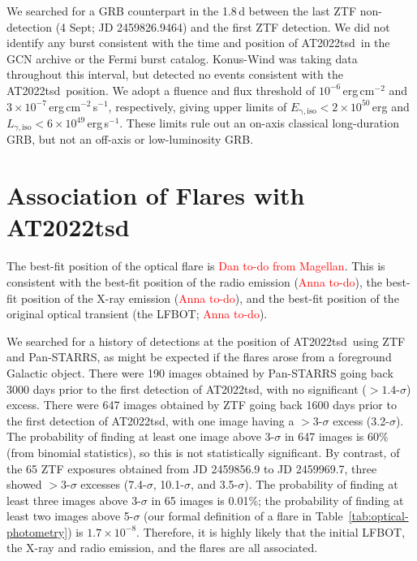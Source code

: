 \documentclass{nature_plusfigure}
\newcommand{\at}{AT2022tsd}
\begin{document}
\begin{methods}
We searched for a GRB counterpart in the 1.8\,d between the last ZTF non-detection (4 Sept; JD 2459826.9464) and the first ZTF detection. We did not identify any burst consistent with the time and position of \at\ in the GCN archive or the Fermi burst catalog. Konus-Wind was taking data throughout this interval, but detected no events consistent with the \at\ position. We adopt a  fluence and flux threshold of $10^{-6}\,$erg\,cm$^{-2}$ and $3\times10^{-7}\,$erg\,cm$^{-2}$\,s$^{-1}$, respectively\cite{Tsvetkova2017},
giving upper limits of $E_\mathrm{\gamma,iso}<2\times10^{50}\,$erg and $L_{\gamma,\mathrm{iso}}<6\times10^{49}\,$erg\,s$^{-1}$.
These limits rule out an on-axis classical long-duration GRB, but not an off-axis or low-luminosity GRB\cite{Cano2017}.

\section{Association of Flares with \at}
\label{sec:flare-association}

The best-fit position of the optical flare is \textcolor{red}{Dan to-do from Magellan}. This is consistent with the best-fit position of the radio emission (\textcolor{red}{Anna to-do}), the best-fit position of the X-ray emission (\textcolor{red}{Anna to-do}), and the best-fit position of the original optical transient (the LFBOT; \textcolor{red}{Anna to-do}). 

We searched for a history of detections at the position of \at\ using ZTF and Pan-STARRS, as might be expected if the flares arose from a foreground Galactic object. There were 190 images obtained by Pan-STARRS going back 3000 days prior to the first detection of \at, with no significant ($>1.4$-$\sigma$) excess\cite{Fulton2022}. There were 647 images obtained by ZTF going back 1600 days prior to the first detection of \at, with one image having a $>3$-$\sigma$ excess (3.2-$\sigma$). The probability of finding at least one image above 3-$\sigma$ in 647 images is 60\% (from binomial statistics), so this is not statistically significant. By contrast, of the 65 ZTF exposures obtained from JD 2459856.9 to JD 2459969.7, three showed $>3$-$\sigma$ excesses (7.4-$\sigma$, 10.1-$\sigma$, and 3.5-$\sigma$). The probability of finding at least three images above 3-$\sigma$ in 65 images is 0.01\%; the probability of finding at least two images above 5-$\sigma$ (our formal definition of a flare in Table~\ref{tab:optical-photometry}) is $1.7\times10^{-8}$. Therefore, it is highly likely that the initial LFBOT, the X-ray and radio emission, and the flares are all associated. 


\end{methods}
\end{document}
